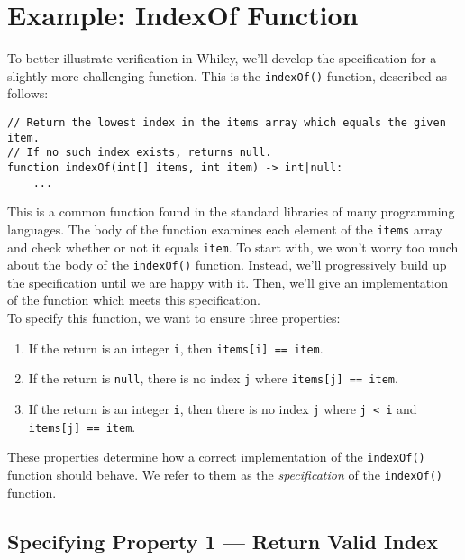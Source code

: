 \newpage
\section{Example: IndexOf Function}

To better illustrate verification in Whiley, we'll develop the
specification for a slightly more challenging function.  This is the
\lstinline{indexOf()} function, described as follows:

\begin{lstlisting}
// Return the lowest index in the items array which equals the given item.
// If no such index exists, returns null.
function indexOf(int[] items, int item) -> int|null:
    ...
\end{lstlisting}

This is a common function found in the standard libraries of many
programming languages.  The body of the function examines each element
of the \lstinline{items} array and check whether or not it equals
\lstinline{item}.  To start with, we won't worry too much about the
body of the \lstinline{indexOf()} function.  Instead, we'll
progressively build up the specification until we are happy with it.
Then, we'll give an implementation of the function which meets this
specification.\\

\noindent To specify this function, we want to ensure three properties:

\begin{enumerate}
\item If the return is an integer \lstinline{i}, then
  \lstinline{items[i] == item}.
\item If the return is \lstinline{null}, there is no index
  \lstinline{j} where \lstinline{items[j] == item}.
\item If the return is an integer \lstinline{i}, then there is
  no index \lstinline{j} where \lstinline{j < i} and
  \lstinline{items[j] == item}.
\end{enumerate}

These properties determine how a correct implementation of the
\lstinline{indexOf()} function should behave.  We refer to them as the
{\em specification} of the \lstinline{indexOf()} function.

\subsection{Specifying Property 1 --- Return Valid Index}

